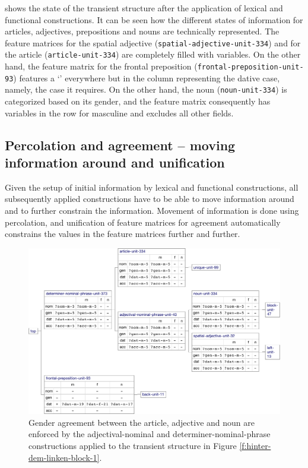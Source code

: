 shows the state of the
transient structure after the application of lexical and functional
constructions. It can be seen how the different states of information
for articles, adjectives, prepositions and nouns are technically
represented. The feature matrices for the spatial adjective
({\footnotesize\texttt{spatial-adjective-unit-334}}) and for the article
({\footnotesize\texttt{article-unit-334}}) are completely filled with variables. On
the other hand, the feature matrix for the frontal preposition
({\footnotesize\texttt{frontal-preposition-unit-93}}) features a `{\textminus}' everywhere but
in the column representing the dative case, namely, the case it
requires. On the other hand, the noun ({\footnotesize\texttt{noun-unit-334}}) is
categorized based on its gender, and the feature matrix consequently
has variables in the row for masculine and excludes all other fields.

\subsection{Percolation and agreement -- moving information around and unification}
Given the setup of initial information by lexical and functional
constructions, all subsequently applied constructions have to be able
to move information around and to further constrain the
information. Movement of information is done using percolation, and
unification of feature matrices for agreement automatically constrains
the values in the feature matrices further and further.

\begin{figure}[t]
  \centerline{\includegraphics[scale=0.5]{figs/hinter-dem-linken-block-2}}
  \caption[Gender agreement represented in the transient structure]{
  Gender agreement 
  between the article, adjective and noun
  are enforced by the adjectival-nominal and
  determiner-nominal-phrase constructions applied to the transient
  structure in Figure \ref{f:hinter-dem-linken-block-1}. }
  \label{f:hinter-dem-linken-block-2}
\end{figure}

